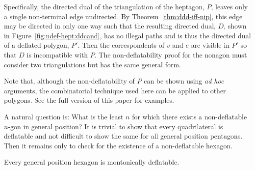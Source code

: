 \documentclass{amsart}
\begin{document}
Specifically, the directed dual of the triangulation of the heptagon,
$P$, leaves only a single non-terminal edge undirected.  By
Theorem~\ref{thm:ddd-iff-nip}, this edge may be directed in only one
way such that the resulting directed dual, $D$, shown in
Figure~\ref{fig:ndef-hept:ddcand}, has no illegal paths and is thus
the directed dual of a deflated polygon, $P'$.  Then the
correspondents of $v$ and $e$ are visible in $P'$ so that $D$ is
incompatible with $P$.  The non-deflatability proof for the nonagon
must consider two triangulations but has the same general form.

\else %

Note that, although the non-deflatability of $P$ can be shown using
\emph{ad hoc} arguments, the combinatorial technique used here can be
applied to other polygons.  See the full version of this
paper \cite{Bose12} for examples.

\fi

\iffullversion

A natural question is: What is the least $n$ for which there exists a
non-deflatable $n$-gon in general position?  It is trivial to show
that every quadrilateral is deflatable and not difficult to show the
same for all general position pentagons.  Then it remains only to
check for the existence of a non-deflatable hexagon.

\begin{theorem}\label{thm:hex-deflate}
  Every general position hexagon is montonically deflatable.
\end{theorem}
\end{document}
